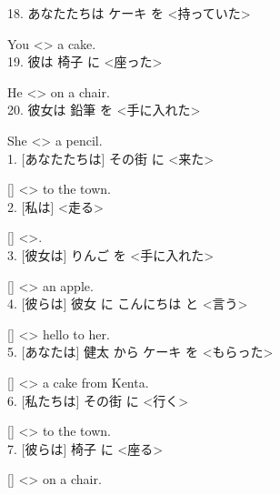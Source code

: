 \documentclass[uplatex,
paper=a4,
fontsize=18pt,
jafontsize=16pt,
number_of_lines=30,
line_length=30zh,
baselineskip=25pt,
]{jlreq}
\begin{document}
18.  あなたたちは ケーキ を <持っていた>

  You <\hspace{3em}> a cake.
\\

19.  彼は 椅子 に <座った>

  He <\hspace{3em}> on a chair.
\\

20.  彼女は 鉛筆 を <手に入れた>

  She <\hspace{3em}> a pencil.
\\


\newpage
{}
1.  [あなたたちは] その街 に <来た>

  [\hspace{3em}] <\hspace{3em}> to the town.
\\

2.  [私は] <走る>

  [\hspace{3em}] <\hspace{3em}>.
\\

3.  [彼女は] りんご を <手に入れた>

  [\hspace{3em}] <\hspace{3em}> an apple.
\\

4.  [彼らは] 彼女 に こんにちは と <言う>

  [\hspace{3em}] <\hspace{3em}> hello to her.
\\

5.  [あなたは] 健太 から ケーキ を <もらった>

  [\hspace{3em}] <\hspace{3em}> a cake from Kenta.
\\

6.  [私たちは] その街 に <行く>

  [\hspace{3em}] <\hspace{3em}> to the town.
\\

7.  [彼らは] 椅子 に <座る>

  [\hspace{3em}] <\hspace{3em}> on a chair.
\\
\end{document}
